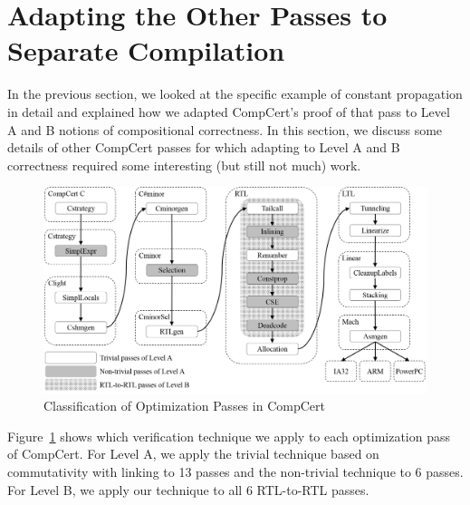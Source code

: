\section{Adapting the Other Passes to Separate Compilation}

In the previous section, we looked at the specific example of constant propagation in detail and
explained how we adapted CompCert's proof of that pass to Level A and B notions of compositional
correctness.  In this section, we discuss some details of other CompCert passes for which adapting
to Level A and B correctness required some interesting (but still not much) work.

\begin{figure}[t]
\includegraphics[width=\textwidth]{sepcomp-passes.png}
\caption{Classification of Optimization Passes in CompCert}
\label{fig:sep-comp-passes}
\end{figure}

Figure~\ref{fig:sep-comp-passes} shows which verification technique we apply to each optimization
pass of CompCert.  For Level A, we apply the trivial technique based on commutativity with linking
to 13 passes and the non-trivial technique to 6 passes.  For Level B, we apply our technique to all
6 RTL-to-RTL passes.




